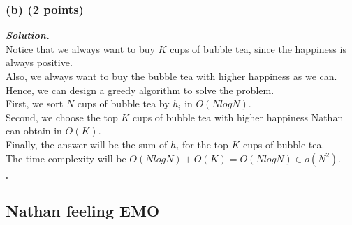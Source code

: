 \documentclass[12pt, a4paper, UTF8]{article}
\newenvironment{solution}[1][\it{Solution}]{\textbf{#1. }\\}{\begin{flushright}$\square$\end{flushright}}
\begin{document}
        \subsubsection*{(b) (2 points)}
            \begin{solution}
                Notice that we always want to buy $K$ cups of bubble tea, since the happiness is always positive.\\
                Also, we always want to buy the bubble tea with higher happiness as we can.\\
                Hence, we can design a greedy algorithm to solve the problem.\\
                First, we sort $N$ cups of bubble tea by $h_i$ in $O(NlogN)$. \\
                Second, we choose the top $K$ cups of bubble tea with higher happiness Nathan can obtain in $O(K)$.\\
                Finally, the answer will be the sum of $h_i$ for the top $K$ cups of bubble tea.\\
                The time complexity will be $O(NlogN) + O(K) = O(NlogN) \in o(N^2)$.
            \end{solution}
    \subsection*{Nathan feeling EMO}
\end{document}

